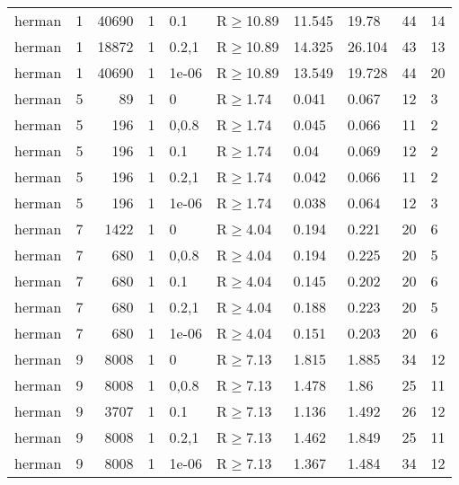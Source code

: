 \begin{longtable}{llrrllllll}
 herman        & 1         &  	40690 &   1 & 0.1   & R$\geq$10.89 & 11.545  & 19.78   & 44      & 14   \\
 herman        & 1         &  	18872 &   1 & 0.2,1 & R$\geq$10.89 & 14.325  & 26.104  & 43      & 13   \\
 herman        & 1         &  	40690 &   1 & 1e-06 & R$\geq$10.89 & 13.549  & 19.728  & 44      & 20   \\
 herman        & 5         &     	89 &   1 & 0     & R$\geq$1.74  & 0.041   & 0.067   & 12      & 3    \\
 herman        & 5         &    	196 &   1 & 0,0.8 & R$\geq$1.74  & 0.045   & 0.066   & 11      & 2    \\
 herman        & 5         &    	196 &   1 & 0.1   & R$\geq$1.74  & 0.04    & 0.069   & 12      & 2    \\
 herman        & 5         &    	196 &   1 & 0.2,1 & R$\geq$1.74  & 0.042   & 0.066   & 11      & 2    \\
 herman        & 5         &    	196 &   1 & 1e-06 & R$\geq$1.74  & 0.038   & 0.064   & 12      & 3    \\
 herman        & 7         &   	1422 &   1 & 0     & R$\geq$4.04  & 0.194   & 0.221   & 20      & 6    \\
 herman        & 7         &    	680 &   1 & 0,0.8 & R$\geq$4.04  & 0.194   & 0.225   & 20      & 5    \\
 herman        & 7         &    	680 &   1 & 0.1   & R$\geq$4.04  & 0.145   & 0.202   & 20      & 6    \\
 herman        & 7         &    	680 &   1 & 0.2,1 & R$\geq$4.04  & 0.188   & 0.223   & 20      & 5    \\
 herman        & 7         &    	680 &   1 & 1e-06 & R$\geq$4.04  & 0.151   & 0.203   & 20      & 6    \\
 herman        & 9         &   	8008 &   1 & 0     & R$\geq$7.13  & 1.815   & 1.885   & 34      & 12   \\
 herman        & 9         &   	8008 &   1 & 0,0.8 & R$\geq$7.13  & 1.478   & 1.86    & 25      & 11   \\
 herman        & 9         &   	3707 &   1 & 0.1   & R$\geq$7.13  & 1.136   & 1.492   & 26      & 12   \\
 herman        & 9         &   	8008 &   1 & 0.2,1 & R$\geq$7.13  & 1.462   & 1.849   & 25      & 11   \\
 herman        & 9         &   	8008 &   1 & 1e-06 & R$\geq$7.13  & 1.367   & 1.484   & 34      & 12   \\

\end{longtable}
